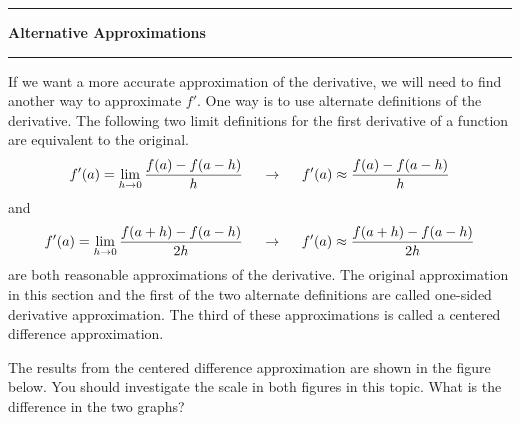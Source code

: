 \documentclass[10pt,fleqn]{article}
\begin{document}
\vskip0.1in\hrule\vskip0.1in \noindent
{\bf Alternative Approximations}
\vskip0.1in\hrule\vskip0.1in \noindent
If we want a more accurate approximation of the derivative, we will need to find
another way to approximate \(f'\). One way is to use alternate definitions of
the derivative. The following two limit definitions for the first derivative of
a function are equivalent to the original. 
\[
  f'(a) = \lim_{h\rightarrow 0} {{f(a)-f(a-h)}\over{h}}
     \ \ \ \ \rightarrow \ \ \ \ f'(a) \approx {{f(a)-f(a-h)}\over{h}}
\]
and
\[
  f'(a) = \lim_{h\rightarrow 0} {{f(a+h)-f(a-h)}\over{2h}}
     \ \ \ \ \rightarrow \ \ \ \ f'(a) \approx {{f(a+h)-f(a-h)}\over{2h}}
\]
are both reasonable approximations of the derivative. The original approximation
in this section and the first of the two alternate definitions are called
one-sided derivative approximation. The third of these approximations is called
a centered difference approximation.

The results from the centered difference approximation are shown in the figure
below. You should investigate the scale in both figures in this topic. What is
the difference in the two graphs?
\end{document}
